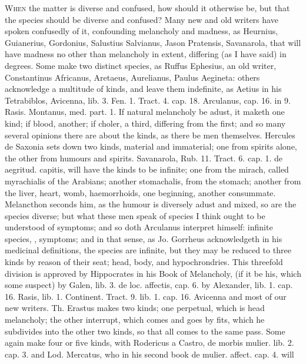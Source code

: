 {{\lettrine{W}{hen} the matter is diverse and confused, how should it otherwise be, but
that the species should be diverse and confused? Many new and old
writers have spoken confusedly of it, confounding melancholy and
madness, as Heurnius, Guianerius, Gordonius, Salustius
Salvianus, Jason Pratensis, Savanarola, that will have madness no other
than melancholy in extent, differing (as I have said) in degrees. Some
make two distinct species, as Ruffus Ephesius, an old writer,
Constantinus Africanus, Aretaeus, Aurelianus, Paulus
Aegineta: others acknowledge a multitude of kinds, and leave them
indefinite, as Aetius in his Tetrabiblos, Avicenna, lib. 3. Fen.
1. Tract. 4. cap. 18. Arculanus, cap. 16. in 9. Rasis. Montanus, med.
part. 1. If natural melancholy be adust, it maketh one kind; if
blood, another; if choler, a third, differing from the first; and so
many several opinions there are about the kinds, as there be men
themselves. Hercules de Saxonia sets down two kinds, material and
immaterial; one from spirits alone, the other from humours and spirits.
Savanarola, Rub. 11. Tract. 6. cap. 1. de aegritud. capitis, will have
the kinds to be infinite; one from the mirach, called myrachialis of
the Arabians; another stomachalis, from the stomach; another from the
liver, heart, womb, haemorrhoids, one beginning, another
consummate. Melancthon seconds him, as the humour is diversely
adust and mixed, so are the species diverse; but what these men speak of
species I think ought to be understood of symptoms; and so doth 
Arculanus interpret himself: infinite species, \ie{}, symptoms; and in
that sense, as Jo. Gorrheus acknowledgeth in his medicinal definitions,
the species are infinite, but they may be reduced to three kinds by
reason of their seat; head, body, and hypochrondries. This threefold
division is approved by Hippocrates in his Book of Melancholy, (if it
be his, which some suspect) by Galen, lib. 3. de loc. affectis, cap. 6.
by Alexander, lib. 1. cap. 16. Rasis, lib. 1. Continent. Tract. 9. lib.
1. cap. 16. Avicenna and most of our new writers. Th. Erastus makes two
kinds; one perpetual, which is head melancholy; the other interrupt,
which comes and goes by fits, which he subdivides into the other two
kinds, so that all comes to the same pass. Some again make four or five
kinds, with Rodericus a Castro, de morbis mulier. lib. 2. cap. 3. and
Lod. Mercatus, who in his second book de mulier. affect. cap. 4. will
}}
